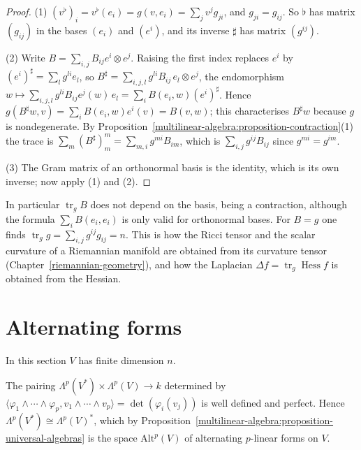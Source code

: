 \begin{proof}
(1) $(v^\flat)_i = v^\flat(e_i) = g(v, e_i) = \sum_jv^jg_{ji}$, and $g_{ji} = g_{ij}$. So $\flat$ has matrix $(g_{ij})$ in the bases $(e_i)$ and $(e^i)$, and its inverse $\sharp$ has matrix $(g^{ij})$.

(2) Write $B = \sum_{i,j}B_{ij}e^i \otimes e^j$. Raising the first index replaces $e^i$ by $(e^i)^\sharp = \sum_lg^{li}e_l$, so $B^\sharp = \sum_{i,j,l}g^{li}B_{ij}\,e_l \otimes e^j$, the endomorphism
$w \mapsto \sum_{i,j,l}g^{li}B_{ij}e^j(w)\,e_l = \sum_iB(e_i, w)(e^i)^\sharp$. Hence $g(B^\sharp w, v) = \sum_iB(e_i, w)e^i(v) = B(v, w)$; this characterises $B^\sharp w$ because $g$ is nondegenerate. By
Proposition~\ref{multilinear-algebra:proposition-contraction}(1) the trace is $\sum_m(B^\sharp)^m_m = \sum_{m,i}g^{mi}B_{im}$, which is $\sum_{i,j}g^{ij}B_{ij}$ since $g^{mi} = g^{im}$.

(3) The Gram matrix of an orthonormal basis is the identity, which is its own inverse; now apply (1) and (2).
\end{proof}

In particular $\operatorname{tr}_gB$ does not depend on the basis, being a contraction, although the formula $\sum_iB(e_i, e_i)$ is only valid for orthonormal bases. For $B = g$ one finds
$\operatorname{tr}_gg = \sum_{i,j}g^{ij}g_{ij} = n$. This is how the Ricci tensor and the scalar curvature of a Riemannian manifold are obtained from its curvature tensor
(Chapter~\ref{riemannian-geometry}), and how the Laplacian $\Delta f = \operatorname{tr}_g\operatorname{Hess}f$ is obtained from the Hessian.

\section{Alternating forms}\label{multilinear-algebra:section-alternating-forms}

In this section $V$ has finite dimension $n$.

\begin{proposition}\label{multilinear-algebra:proposition-dual-exterior}
The pairing $\Lambda^p(V^*) \times \Lambda^p(V) \to k$ determined by
$\langle \varphi_1 \wedge \cdots \wedge \varphi_p, v_1 \wedge \cdots \wedge v_p \rangle = \det(\varphi_i(v_j))$ is well defined and perfect. Hence
$\Lambda^p(V^*) \cong \Lambda^p(V)^*$, which by Proposition~\ref{multilinear-algebra:proposition-universal-algebras}
is the space $\mathrm{Alt}^p(V)$ of alternating $p$-linear forms on $V$.
\end{proposition}

